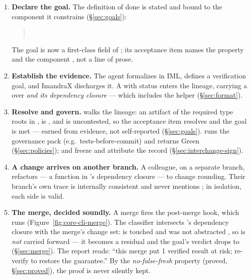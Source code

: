 \begin{enumerate}
\item \textbf{Declare the goal.} The definition of done is stated and bound to the component it constrains
(\S\ref{sec:goals}):
\begin{quote}
\\
\end{quote}
The goal is now a first-class field of \trace{}; its acceptance item names the property and the component
, not a line of prose.

\item \textbf{Establish the evidence.} The agent formalizes  in IML, defines a verification goal,
and ImandraX discharges it. A   with status  enters the
lineage, carrying a  over  \emph{and its dependency closure} --- which
includes the helper  (\S\ref{sec:format}).

\item \textbf{Resolve and govern.}  walks the lineage: an artifact of the required
type roots in , is , and is uncontested, so the acceptance item resolves 
and the goal is met --- earned from evidence, not self-reported (\S\ref{sec:goals}). 
runs the governance pack (e.g.\ tests-before-commit) and returns Green (\S\ref{sec:policies});  and  freeze and attribute the record (\S\ref{sec:interchange-sign}).

\item \textbf{A change arrives on another branch.} A colleague, on a separate branch, refactors
 --- a function in 's dependency closure --- to change rounding. Their branch's
own trace is internally consistent and never mentions ; in isolation, each side is valid.

\item \textbf{The merge, decided soundly.} A  merge fires the post-merge hook, which runs
 (Figure~\ref{fig:core-cli-merge}).
The classifier intersects 's dependency closure with the merge's change set: 
is touched and was not abstracted , so  is \emph{not} carried forward --- it
becomes a  residual and the goal's verdict drops to  (\S\ref{sec:merge}).
The report reads: ``this merge put 1 verified result at risk; re-verify to restore the guarantee.'' By the
\emph{no-false-fresh} property (proved, \S\ref{sec:proved}), the proof is never silently kept.


\end{enumerate}
